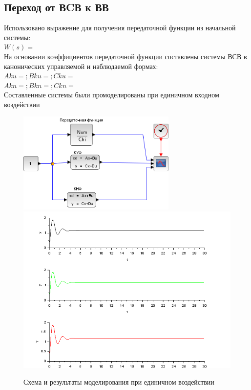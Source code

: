 \documentclass[a4paper,12pt,russian]{article} %
\begin{document}
\subsection{Переход от ВCВ к ВВ}
Использовано выражение для получения передаточной функции из начальной системы:\\
$W(s)=$\\

На основании коэффициентов передаточной функции составлены системы ВСВ в канонических управляемой и наблюдаемой формах:\\
$Aku=;Bku=;Cku=$\\
$Akn=;Bkn=;Ckn=$\\

Составленные системы были промоделированы при единичном входном воздействии\\
\begin{figure}[H]
	\includegraphics[width=0.7\textwidth]{SS}
	\includegraphics[width=1\textwidth]{SS-sim}
	\caption{Схема и результаты моделирования при единичном воздействии}
\end{figure}
\end{document}
